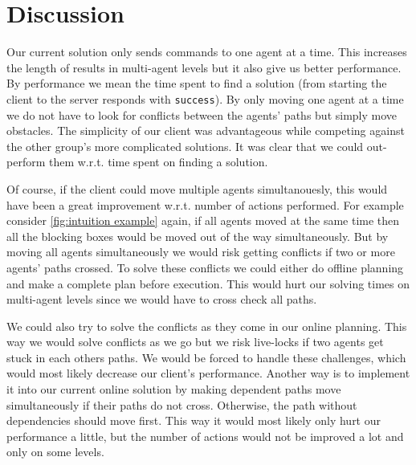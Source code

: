 \section{Discussion}
\label{sec:discussion}
Our current solution only sends commands to one agent at a time.
This increases the length of results in multi-agent levels but it also give us better performance.
By performance we mean the time spent to find a solution (from starting the client to the server responds with \texttt{success}).
By only moving one agent at a time we do not have to look for conflicts between the agents' paths but simply move obstacles.
The simplicity of our client was advantageous while competing against the other group's more complicated solutions.
It was clear that we could out-perform them w.r.t. time spent on finding a solution.

Of course, if the client could move multiple agents simultanouesly, this would have been a great improvement w.r.t. number of actions performed.
For example consider \cref{fig:intuition example} again, if all agents moved at the same time then all the blocking boxes would be moved out of the way simultaneously.
But by moving all agents simultaneously we would risk getting conflicts if two or more agents' paths crossed.
To solve these conflicts we could either do offline planning and make a complete plan before execution.
This would hurt our solving times on multi-agent levels since we would have to cross check all paths.

We could also try to solve the conflicts as they come in our online planning.
This way we would solve conflicts as we go but we risk live-locks if two agents get stuck in each others paths.
We would be forced to handle these challenges, which would most likely decrease our client's performance.
Another way is to implement it into our current online solution by making dependent paths move simultaneously if their paths do not cross.
Otherwise, the path without dependencies should move first.
This way it would most likely only hurt our performance a little, but the number of actions would not be improved a lot and only on some levels.

%



